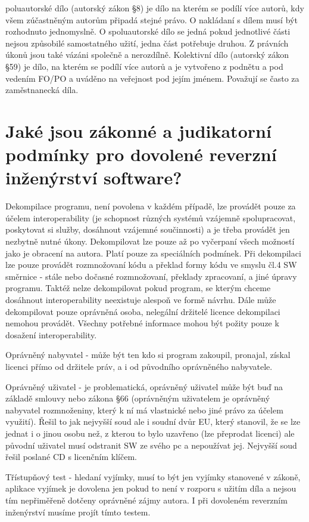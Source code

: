 poluautorské dílo (autorský zákon §8) je dílo na kterém se podílí více autorů, kdy všem zúčastněným autorům připadá stejné právo. O nakládaní s dílem musí být rozhodnuto jednomyslně. O spoluautorské dílo se jedná pokud jednotlivé části nejsou způsobilé samostatného užití, jedna část potřebuje druhou. Z právních úkonů jsou také vázáni společně a nerozdílně.
Kolektivní dílo (autorský zákon §59) je dílo, na kterém se podílí více autorů a je vytvořeno z podnětu a pod vedením FO/PO a uváděno na veřejnost pod jejím jménem. Považují se často za zaměstnanecká díla.

\vspace{0.5cm} 
\section{Jaké jsou zákonné a judikatorní podmínky pro dovolené reverzní inženýrství software?}

Dekompilace programu, není povolena v každém případě, lze provádět pouze za účelem interoperability (je schopnost různých systémů vzájemně spolupracovat, poskytovat si služby, dosáhnout vzájemné součinnosti) a je třeba provádět jen nezbytně nutné úkony. Dekompilovat lze pouze až po vyčerpaní všech možností jako je obracení na autora. Platí pouze za speciálních podmínek. Při dekompilaci lze pouze provádět rozmnožovaní kódu a překlad formy kódu ve smyslu čl.4 SW směrnice - stále nebo dočasné rozmnožovaní, překlady zpracovaní, a jiné úpravy programu. Taktéž nelze dekompilovat pokud program, se kterým chceme dosáhnout interoperability neexistuje alespoň ve formě návrhu. Dále může dekompilovat pouze oprávněná osoba, nelegální držitelé licence dekompilaci nemohou provádět. Všechny potřebné informace mohou být požity pouze k dosažení interoperability. 

Oprávněný nabyvatel - může být ten kdo si program zakoupil, pronajal, získal licenci přímo od držitele práv, a i od původního oprávněného nabyvatele.

Oprávněný uživatel - je problematická, oprávněný uživatel může být buď na základě smlouvy nebo zákona §66 (oprávněným uživatelem je oprávněný nabyvatel rozmnoženiny, který k ní má vlastnické nebo jiné právo za účelem využití). Řešil to jak nejvyšší soud ale i soudní dvůr EU, který stanovil, že se lze jednat i o jinou osobu než, z kterou to bylo uzavřeno (lze přeprodat licenci) ale původní uživatel musí odstranit SW ze svého pc a nepoužívat jej. Nejvyšší soud řešil poslané CD s licenčním klíčem.

Třístupňový test - hledaní vyjímky, musí to být jen vyjímky stanovené v zákoně, aplikace vyjímek je dovolena jen pokud to není v rozporu s užitím díla a nejsou tím nepřiměřeně dotčeny oprávněné zájmy autora. I při dovoleném reverzním inženýrství musíme projít tímto testem.


